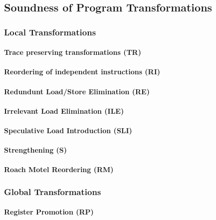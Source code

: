 \subsection{Soundness of Program Transformations}
\label{sec:bgrnd-opt-sound}

\subsubsection{Local Transformations}

\paragraph{Trace preserving transformations (TR)}

\paragraph{Reordering of independent instructions (RI)}

\paragraph{Redundunt Load/Store Elimination (RE)}

\paragraph{Irrelevant Load Elimination (ILE)}

\paragraph{Speculative Load Introduction (SLI)}

\paragraph{Strengthening (S)}

\paragraph{Roach Motel Reordering (RM)}

\subsubsection{Global Transformations}

\paragraph{Register Promotion (RP)}


